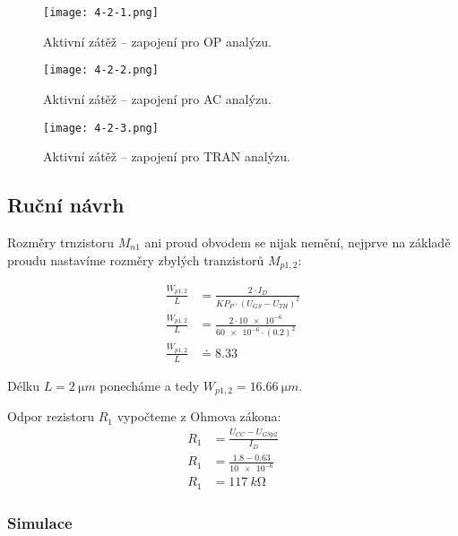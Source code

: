 \begin{figure}[h!]
    \centering
    \texttt{[image: 4-2-1.png]}
    \caption{Aktivní zátěž -- zapojení pro OP analýzu.}
    \label{fig:spice0-png}
  \end{figure}
  \begin{figure}[h!]
      \centering
      \texttt{[image: 4-2-2.png]}
      \caption{Aktivní zátěž -- zapojení pro AC analýzu.}
      \label{fig:spice0-png}
    \end{figure}
    \begin{figure}[h!]
      \centering
      \texttt{[image: 4-2-3.png]}
      \caption{Aktivní zátěž -- zapojení pro TRAN analýzu.}
      \label{fig:spice0-png}
    \end{figure}
\subsection{Ruční návrh}
    Rozměry trnzistoru \(M_{n1} \) ani proud obvodem se nijak nemění, nejprve na základě proudu nastavíme rozměry zbylých tranzistorů \(M_{p1,2} \):



\begin{align*}
    \frac{W_{p1,2} }{L}&=\frac{2\cdot I_{D}}{KP_{P}\cdot (U_{GS} -U_{TH})^2 } \\
    \frac{W_{p1,2} }{L}&=\frac{2\cdot \num{10e-6}}{\num{60e-6}\cdot (\num{0.2})^2 } \\
    \frac{W_{p1,2} }{L}&\doteq \num[round-mode=places,round-precision=2]{8.33} 
\end{align*}

Délku \(L=\qty{2}{\micro m}\) ponecháme a tedy \(W_{p1,2}=\qty{16.66}{\micro m} \). 

Odpor rezistoru \(R_{1} \) vypočteme z Ohmova zákona:
\begin{align*}
    R_{1} &= \frac{U_{CC} - U_{GSp2}}{I_{D} } \\
    R_{1} &= \frac{\num{1.8} - \num{0.63}}{\num{10e-6} } \\
    R_{1} &= \qty{117}{k\ohm} 
\end{align*}


\subsubsection{Simulace}


